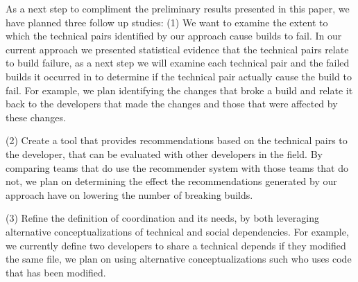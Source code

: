 \documentclass[conference]{IEEEtran}
\begin{document}


As a next step to compliment the preliminary results presented in this paper, we have planned three follow up studies:
(1) We want to examine the extent to which the technical pairs identified by our approach cause builds to fail. 
In our current approach we presented statistical evidence that the technical pairs relate to build failure, as a next step we will examine each technical pair and the failed builds it occurred in to determine if the technical pair actually cause the build to fail.
For example, we plan identifying the changes that broke a build and relate it back to the developers that made the changes and those that were affected by these changes.
%

(2) Create a tool that provides recommendations based on the technical pairs to the developer, that can be evaluated with other developers in the field.
By comparing teams that do use the recommender system with those teams that do not, we plan on determining the effect the recommendations generated by our approach have on lowering the number of breaking builds.

(3) Refine the definition of coordination and its needs, by both leveraging alternative conceptualizations of technical and social dependencies.
For example, we currently define two developers to share a technical depends if they modified the same file, we plan on using alternative conceptualizations such who uses code that has been modified.


\end{document}
